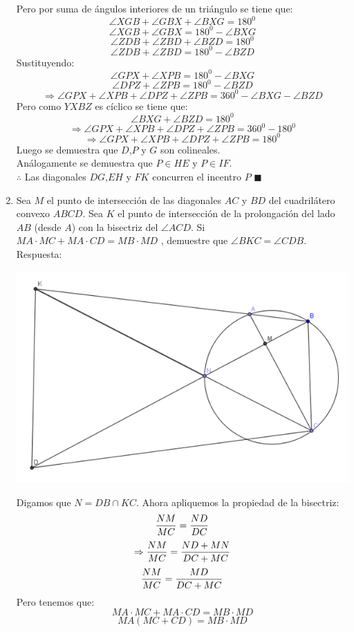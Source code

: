 \documentclass{book}
\begin{document}
\begin{enumerate}
Pero por suma de ángulos interiores de un triángulo se tiene que:
$$\angle XGB+\angle GBX+\angle BXG=180^0$$
$$\angle XGB+\angle GBX=180^0-\angle BXG$$
$$\angle ZDB+\angle ZBD+\angle BZD=180^0$$
$$\angle ZDB+\angle ZBD=180^0-\angle BZD$$
Sustituyendo:
$$\angle GPX+\angle XPB=180^0-\angle BXG$$
$$\angle DPZ+\angle ZPB=180^0-\angle BZD$$
$$\Rightarrow\angle GPX+\angle XPB+\angle DPZ+\angle ZPB=360^0-\angle BXG-\angle BZD$$
Pero como $YXBZ$ es cíclico se tiene que:
$$\angle BXG+\angle BZD=180^0$$
$$\Rightarrow\angle GPX+\angle XPB+\angle DPZ+\angle ZPB=360^0-180^0$$
$$\Rightarrow\angle GPX+\angle XPB+\angle DPZ+\angle ZPB=180^0$$
Luego se demuestra que $D$,$P$ y $G$ son colineales.\\
Análogamente se demuestra que  $P\in HE$ y $P\in IF$.\\
$\therefore$ Las diagonales $DG$,$EH$ y $FK$ concurren el incentro $P$ $\blacksquare$\\
				\item Sea $M$ el punto de intersección de las diagonales $AC$ y $BD$ del cuadrilátero convexo $ABCD$. Sea $K$ el punto de intersección de la prolongación del lado $AB$ (desde $A$) con la bisectriz del $\angle ACD$. Si $MA\cdot MC + MA\cdot CD =MB \cdot MD$ , demuestre que $\angle BKC = \angle CDB$. \\
					Respuesta:
					\begin{center}
						\includegraphics[scale=1]{imagenes/Geometria/11.png}
					\end{center}
					Digamos que $N=DB\cap KC$. Ahora apliquemos la propiedad de la bisectriz:
$${NM\over MC}={ND\over DC}$$
$$\Rightarrow{NM\over MC}={ND+MN\over DC+MC}$$
$${NM\over MC}={MD\over DC+MC}$$
Pero tenemos que:
$$MA\cdot MC + MA\cdot CD = MB\cdot MD$$
$$MA( MC+CD) = MB\cdot MD$$

\end{enumerate}
\end{document}
